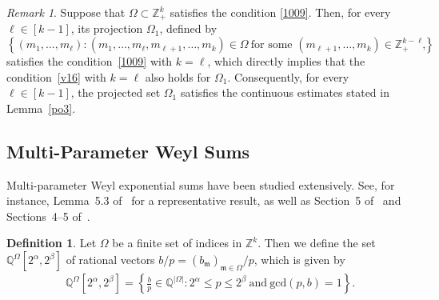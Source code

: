 \documentclass[11 pt,letterpaper]{amsart}
\theoremstyle{plain}
\theoremstyle{definition}
\newtheorem{definition}{Definition}\numberwithin{definition}{section}
\theoremstyle{remark} \theoremstyle{exam} \theoremstyle{ob}
\newtheorem{remark}{Remark}\numberwithin{remark}{section}
\numberwithin{equation}{section}
\begin{document}
 
 
 
 \begin{remark}\label{re3.1}
Suppose that 	$\Omega\subset\mathbb{Z}_+^{k}$ satisfies the condition \eqref{1009}. Then, for every $\ell\in [k-1]$, its projection $\Omega_1$, defined by
	$$
	\left\{
	(m_1,\ldots,m_\ell):
	(m_1,\ldots,m_\ell,m_{\ell+1},\ldots,m_{k})
	\in\Omega \ \text{for some $(m_{\ell+1},\ldots,m_{k})\in \mathbb{Z}_{+}^{k-\ell}$}
	\right\},
	$$
	  satisfies the condition~\eqref{1009} with $k=\ell$, which directly implies that the condition~\eqref{v16} with $k=\ell$ also holds for $\Omega_1$. Consequently, for every $\ell\in[k-1]$, the projected set $\Omega_1$ satisfies the continuous estimates stated in Lemma~\ref{po3}.
\end{remark}













\subsection{Multi-Parameter Weyl Sums}
 Multi-parameter Weyl exponential sums have been studied extensively. See, for instance, Lemma~5.3 of~\cite{ACK} for a representative result, as well as Section~5 of~\cite{B4} and Sections~4--5 of~\cite{KS}.
 
 
 
 


\begin{definition}\label{df23}
	Let $\Omega$ be a finite set of indices in $\mathbb{Z}^{k}$.
	Then we  define  the set  $\mathbb{Q}^{\Omega}[2^{\alpha},2^{\beta}]$
	of  rational vectors  $b/p=(b_\mathfrak{m})_{\mathfrak{m}\in \Omega} /p$,  which is given by
	\begin{align*} 
		\ \ \mathbb{Q}^{\Omega}[2^{\alpha},2^{\beta}]=  \left\{\frac{b}{p}\in   \mathbb{Q}^{|\Omega|}: 2^{\alpha}\le p \le 2^{\beta}\ \text{and}\  \text{gcd}(p,b)=1\right\}.
	\end{align*}
\end{definition}
\end{document}
